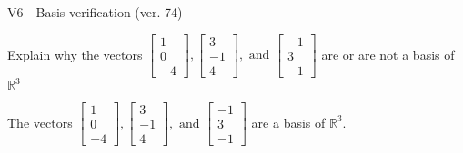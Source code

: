 \begin{exercise}
  \begin{exerciseTitle}V6 - Basis verification (ver. 74)\end{exerciseTitle}
  \begin{exerciseStatement}
    Explain why the vectors \(\left[\begin{array}{r}
1 \\
0 \\
-4
\end{array}\right] , \left[\begin{array}{r}
3 \\
-1 \\
4
\end{array}\right] , \text{ and } \left[\begin{array}{r}
-1 \\
3 \\
-1
\end{array}\right]\) are or are not a basis of \(\mathbb{R}^3\)	


  \end{exerciseStatement}
  \begin{exerciseAnswer}
   The vectors \(\left[\begin{array}{r}
1 \\
0 \\
-4
\end{array}\right] , \left[\begin{array}{r}
3 \\
-1 \\
4
\end{array}\right] , \text{ and } \left[\begin{array}{r}
-1 \\
3 \\
-1
\end{array}\right]\) 
  	 are  a basis of \(\mathbb{R}^3\).
  


  \end{exerciseAnswer}
\end{exercise}